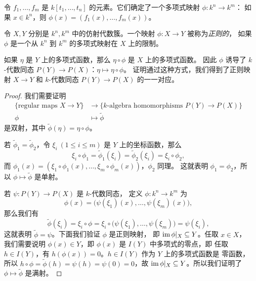 \begin{problem}
  令 $f_1,\dots,f_m$ 是 $k[t_1,\dots,t_n]$ 的元素。它们确定了一个多项式映射 $\phi:k^n\to k^m$：
  如果 $x\in k^n$，则 $\phi(x)=(f_1(x),\dots,f_m(x))$。

  令 $X,Y$ 分别是 $k^n,k^m$ 中的仿射代数簇。一个映射 $\phi:X\to Y$ 被称为\emph{正则的}，
  如果 $\phi$ 是一个从 $k^n$ 到 $k^m$ 的多项式映射在 $X$ 上的限制。

  如果 $\eta$ 是 $Y$ 上的多项式函数，那么 $\eta\circ\phi$ 是 $X$ 上的多项式函数。
  因此 $\phi$ 诱导了 $k$-代数同态 $P(Y)\to P(X)$：$\eta\mapsto\eta\circ\phi$。
  证明通过这种方式，我们得到了正则映射 $X\to Y$ 和 $k$-代数同态 $P(Y)\to P(X)$
  的一一对应。
\end{problem}
\begin{proof}
  我们需要证明
  \begin{align*}
    \{\text{regular maps $X\to Y$}\}&\to
    \{\text{$k$-algebra homomorphisms $P(Y)\to P(X)$}\}\\
    \phi&\mapsto \tilde{\phi}
  \end{align*}
  是双射，其中 $\tilde{\phi}(\eta)=\eta\circ \phi$。

  若 $\tilde{\phi}_1=\tilde{\phi}_2$，令 $\xi_i\ (1\leq i\leq m)$ 是 $Y$
  上的坐标函数，那么
  \[
    \xi_i\circ\phi_1=\tilde{\phi}_1(\xi_i)=\tilde{\phi}_2(\xi_i)
    =\xi_i\circ\phi_2,  
  \]
  而 $\phi_1(x)=(\xi_1\circ\phi_1(x),\dots,\xi_m\circ\phi_m(x))$，$\phi_2$ 同理。
  这就表明 $\phi_1=\phi_2$，所以 $\phi\mapsto \tilde{\phi}$ 是单射。

  若 $\psi:P(Y)\to P(X)$ 是 $k$-代数同态，
  定义 $\phi:k^n\to k^m$ 为
  \[
    \phi(x)=\bigl(\psi(\xi_1)(x),\dots,\psi(\xi_m)(x)\bigr)  ,
  \]
  那么我们有
  \[
    \tilde{\phi}(\xi_i)=\xi_i\circ\phi=\xi_i\circ
    \bigl(\psi(\xi_1),\dots,\psi(\xi_m)\bigr)
    =\psi(\xi_i),
  \]
  这就表明 $\tilde{\phi}=\psi$。下面我们验证 $\phi$ 是正则映射，
  即 $\operatorname{im}\phi|_X\subseteq Y$。任取 $x\in X$，
  我们需要说明 $\phi(x)\in Y$，即 $\phi(x)$ 是 $I(Y)$ 中多项式的零点，即
  任取 $h\in I(Y)$，有 $h(\phi(x))=0$。$h\in I(Y)$ 作为 $Y$ 上的多项式函数是
  零函数，所以 $h\circ\phi=\tilde{\phi}(h)=\psi(h)=\psi(0)=0$，故 
  $\operatorname{im}\phi|_X\subseteq Y$。所以我们证明了 $\phi\mapsto \tilde{\phi}$ 是满射。
\end{proof}
